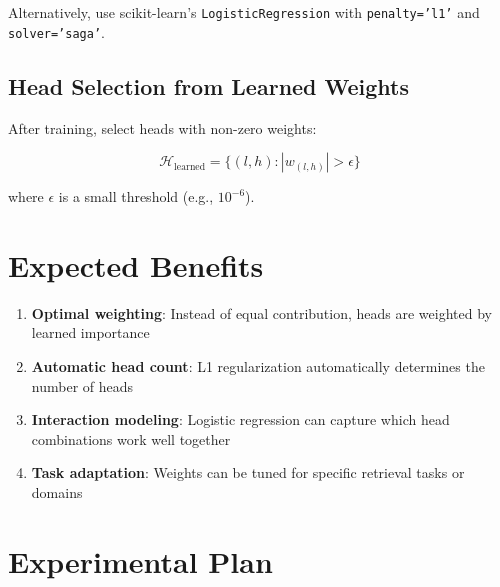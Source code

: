 \documentclass[11pt,a4paper]{article}
\begin{document}
Alternatively, use scikit-learn's \texttt{LogisticRegression} with \texttt{penalty='l1'} and \texttt{solver='saga'}.

\subsection{Head Selection from Learned Weights}

After training, select heads with non-zero weights:

\begin{equation}
    \mathcal{H}_{\text{learned}} = \{(l,h) : |w_{(l,h)}| > \epsilon\}
\end{equation}

where $\epsilon$ is a small threshold (e.g., $10^{-6}$).

\section{Expected Benefits}

\begin{enumerate}
    \item \textbf{Optimal weighting}: Instead of equal contribution, heads are weighted by learned importance
    \item \textbf{Automatic head count}: L1 regularization automatically determines the number of heads
    \item \textbf{Interaction modeling}: Logistic regression can capture which head combinations work well together
    \item \textbf{Task adaptation}: Weights can be tuned for specific retrieval tasks or domains
\end{enumerate}

\section{Experimental Plan}
\end{document}
